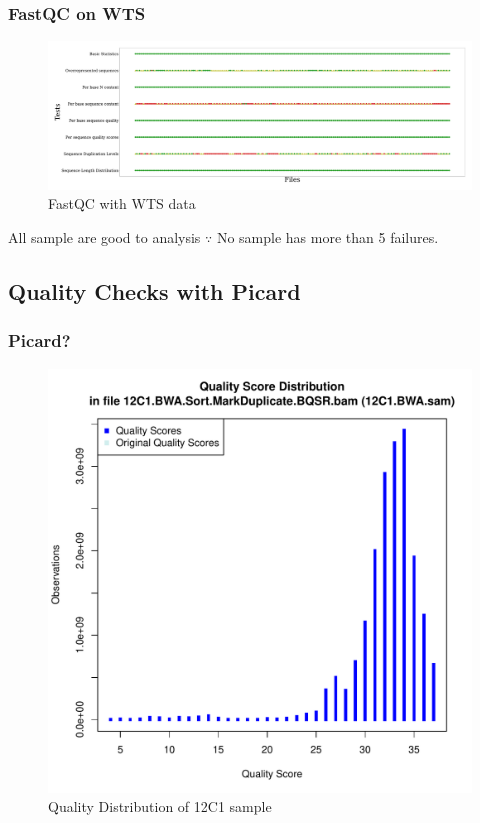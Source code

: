 \documentclass{beamer}
\begin{document}
    \begin{frame}
        \frametitle{FastQC on WTS}

        \begin{figure}
            \includegraphics[width=\linewidth]{figures/FastQC/FastQC_WTS.pdf}
            \caption{FastQC with WTS data}
        \end{figure}

        \begin{exampleblock}{All sample are good to analysis}
            $\because$ No sample has more than 5 failures.
        \end{exampleblock}
    \end{frame}

    \subsection{Quality Checks with Picard}
    \begin{frame}
        \frametitle{Picard?}

        \begin{figure}
            \includegraphics[width=0.5 \linewidth]{figures/CollectMultipleMetrics/12C1.quality_distribution.pdf}
            \caption{Quality Distribution of 12C1 sample}
        \end{figure}
    \end{frame}
\end{document}
